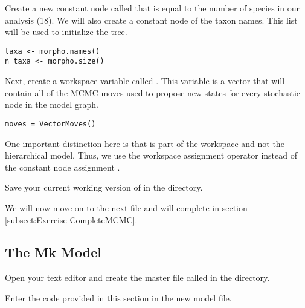 Create a new constant node called  that is equal to the number of species in our analysis (18). 
We will also create a constant node of the taxon names.
This list will be used to initialize the tree.

{\tt \begin{snugshade*}
\begin{lstlisting}
taxa <- morpho.names()
n_taxa <- morpho.size() 
\end{lstlisting}
\end{snugshade*}}


Next, create a workspace variable called . 
This variable is a vector that will contain all of the MCMC moves used to propose new states for every stochastic node in the model graph. 

{\tt \begin{snugshade*}
\begin{lstlisting}
moves = VectorMoves()
\end{lstlisting}
\end{snugshade*}}
One important distinction here is that  is part of the \RevBayes workspace and not the hierarchical model. 
Thus, we use the workspace assignment operator \cl{=} instead of the constant node assignment \cl{<-}. 

{\begin{framed}
Save your current working version of  in the  directory.

We will now move on to the next \Rev file and will complete  in section \ref{subsect:Exercise-CompleteMCMC}.
\end{framed}}


\bigskip
\subsection{The Mk Model}

{\begin{framed}
Open your text editor and create the master \Rev file called {\textcolor{red}{}} in the  directory.

Enter the \Rev code provided in this section in the new model file.
\end{framed}}

